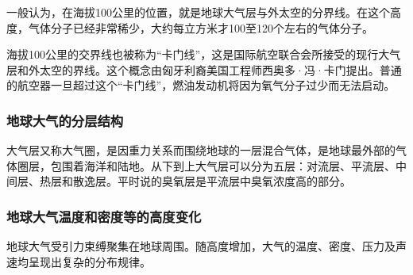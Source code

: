 \documentclass[12pt,a4paper]{article}
\begin{document}
	一般认为，在海拔100公里的位置，就是地球大气层与外太空的分界线。在这个高度，气体分子已经非常稀少，大约每立方米才100至120个左右的气体分子。
	
	海拔100公里的交界线也被称为“卡门线”，这是国际航空联合会所接受的现行大气层和外太空的界线。这个概念由匈牙利裔美国工程师西奥多·冯·卡门提出。普通的航空器一旦超过这个“卡门线”，燃油发动机将因为氧气分子过少而无法启动。
	
	\subsubsection{地球大气的分层结构}	
	
	大气层又称大气圈，是因重力关系而围绕地球的一层混合气体，是地球最外部的气体圈层，包围着海洋和陆地。从下到上大气层可以分为五层：对流层、平流层、中间层、热层和散逸层。平时说的臭氧层是平流层中臭氧浓度高的部分。
	\subsubsection{地球大气温度和密度等的高度变化}
	
	地球大气受引力束缚聚集在地球周围。随高度增加，大气的温度、密度、压力及声速均呈现出复杂的分布规律。
	
\end{document}
